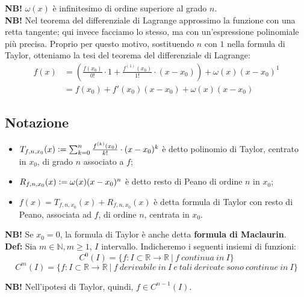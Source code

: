 \documentclass{article}
\begin{document}
\noindent\textbf{NB!} $\omega(x)$ è infinitesimo di ordine superiore al grado $n$.\\

\noindent\textbf{NB!} Nel teorema del differenziale di Lagrange approssimo la funzione con una retta tangente; qui invece facciamo lo stesso, ma con un'espressione polinomiale più precisa. Proprio per questo motivo, sostituendo $n$ con $1$ nella formula di Taylor, otteniamo la tesi del teorema del differenziale di Lagrange:
\begin{align*}
    f(x) &= \left(\frac{f(x_0)}{0!} \cdot 1 + \frac{f^{(1)}(x_0)}{1!} \cdot (x - x_0)\right) + \omega(x)(x - x_0)^1\\
    &= f(x_0) + f'(x_0)(x - x_0) + \omega(x)(x - x_0)
\end{align*}

\subsection{Notazione}
\begin{itemize}
    \item $T_{f,n,x_0}(x) \vcentcolon= \sum_{k = 0}^n \frac{f^{(k)}(x_0)}{k!} \cdot (x - x_0)^k$ è detto polinomio di Taylor, centrato in $x_0$, di grado $n$ associato a $f$;
    \item $R_{f, n, x_0}(x) \vcentcolon = \omega(x)(x - x_0)^n$ è detto resto di Peano di ordine $n$ in $x_0$;
    \item $f(x) = T_{f,n,x_0}(x) + R_{f, n, x_0}(x)$ è detta formula di Taylor con resto di Peano, associata ad $f$, di ordine $n$, centrata in $x_0$.
\end{itemize}

\noindent\textbf{NB!} Se $x_0 = 0$, la formula di Taylor è anche detta \textbf{formula di Maclaurin}.\\

\noindent\textbf{Def:} Sia $m \in \mathbb{N}, m \geq 1$, $I$ intervallo. Indicheremo i seguenti insiemi di funzioni:
\begin{equation*}
    C^0(I) = \{f: I \subset \mathbb{R} \xrightarrow{} \mathbb{R} \ | \ f \ continua \ in \ I\}
\end{equation*}
\begin{equation*}
    C^m(I) = \{f: I \subset \mathbb{R} \xrightarrow{} \mathbb{R} \ | \ f \ derivabile \ in \ I \ e \ tali \ derivate \ sono \ continue \ in \ I\}
\end{equation*}

\noindent\textbf{NB!} Nell'ipotesi di Taylor, quindi, $f \in C^{n - 1}(I)$.
\end{document}
